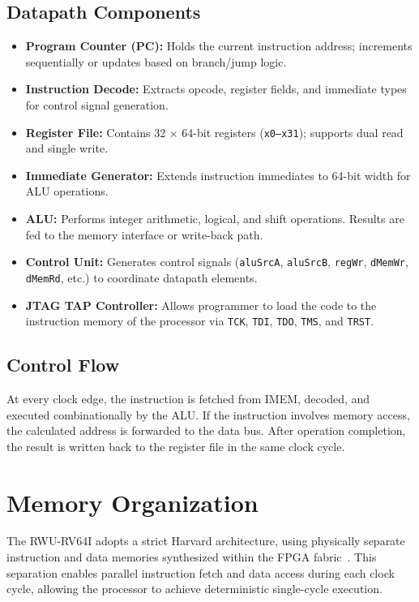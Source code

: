 \subsection{Datapath Components}
\begin{itemize}
  \item \textbf{Program Counter (PC):} Holds the current instruction address; increments sequentially or updates based on branch/jump logic.
  \item \textbf{Instruction Decode:} Extracts opcode, register fields, and immediate types for control signal generation.
  \item \textbf{Register File:} Contains 32 × 64-bit registers (\texttt{x0–x31}); supports dual read and single write.
  \item \textbf{Immediate Generator:} Extends instruction immediates to 64-bit width for ALU operations.
  \item \textbf{ALU:} Performs integer arithmetic, logical, and shift operations. Results are fed to the memory interface or write-back path.
  \item \textbf{Control Unit:} Generates control signals (\texttt{aluSrcA}, \texttt{aluSrcB}, \texttt{regWr}, \texttt{dMemWr}, \texttt{dMemRd}, etc.) to coordinate datapath elements.
  \item \textbf{JTAG TAP Controller:} Allows programmer to load the code to the instruction memory of the processor via \texttt{TCK}, \texttt{TDI}, \texttt{TDO}, \texttt{TMS}, and \texttt{TRST}.
\end{itemize}

\subsection{Control Flow}
At every clock edge, the instruction is fetched from IMEM, decoded, and executed combinationally by the ALU.  
If the instruction involves memory access, the calculated address is forwarded to the data bus.  
After operation completion, the result is written back to the register file in the same clock cycle.

\section{Memory Organization}
\label{sec:memorg}

The RWU-RV64I adopts a strict Harvard architecture, using physically separate instruction and data memories synthesized within the FPGA fabric~\cite{harvard_architecture}.  
This separation enables parallel instruction fetch and data access during each clock cycle, allowing the processor to achieve deterministic single-cycle execution.

